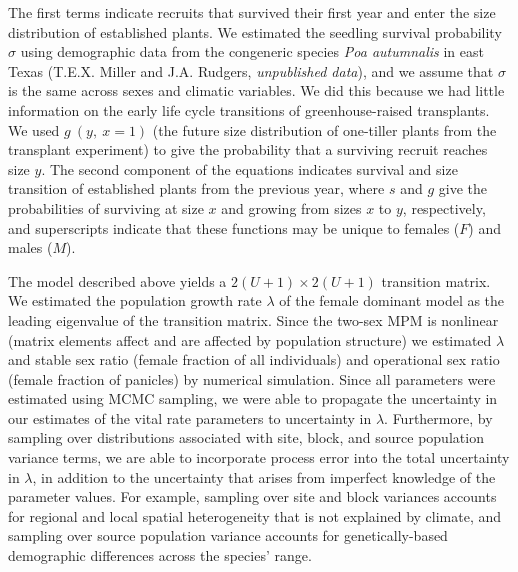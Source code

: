 \documentclass[9pt,twocolumn,twoside,lineno]{pnas-new}
\newcommand{\revise}[1]{{\color{Mahogany}{#1}}}
\begin{document}
\noindent The first terms indicate recruits that survived their first year and enter the size distribution of established plants.
We estimated the seedling survival probability $\sigma$ using demographic data from the congeneric species \textit{Poa autumnalis} in east Texas (T.E.X. Miller and J.A. Rudgers, \textit{unpublished data}), and we assume that $\sigma$ is the same across sexes and climatic variables. 
We did this because we had little information on the early life cycle transitions of greenhouse-raised transplants.
We used $g\ (y,\ x=1)$ (the future size distribution of one-tiller plants from the transplant experiment) to give the probability that a surviving recruit reaches size $y$.
The second component of the equations indicates survival and size transition of established plants from the previous year, where $s$ and $g$ give the probabilities of surviving at size $x$ and growing from sizes $x$ to $y$, respectively, and superscripts indicate that these functions may be unique to females ($F$) and males ($M$).

The model described above yields a $2(U+1) \times 2(U+1)$ transition matrix. 
\revise{The matrix population model is  structured like  integral projection model (IPM) but is  not one  for several reasons. 
First, we used two discrete state variables: sex and size. 
Second, unlike an IPM, we employed a discrete probability distribution (the Poisson Inverse-Gaussian) to define transitions from each initial size to each possible subsequent size. 
Finally, there is no integration of the matrix.}
We estimated the population growth rate $\lambda$ of the female dominant model as the leading eigenvalue of the transition matrix. 
Since the two-sex MPM is nonlinear (matrix elements affect and are affected by population structure) we estimated $\lambda$ and stable sex ratio (female fraction of all individuals) and operational sex ratio (female fraction of panicles) by numerical simulation.
Since all parameters were estimated using MCMC sampling, we were able to propagate the uncertainty in our estimates of the vital rate parameters to uncertainty in $\lambda$. 
Furthermore, by sampling over distributions associated with site, block, and source population variance terms, we are able to incorporate process error into the total uncertainty in $\lambda$, in addition to the uncertainty that arises from imperfect knowledge of the parameter values. 
For example, sampling over site and block variances accounts for regional and local spatial heterogeneity that is not explained by climate, and sampling over source population variance accounts for genetically-based demographic differences across the species' range.
\end{document}
